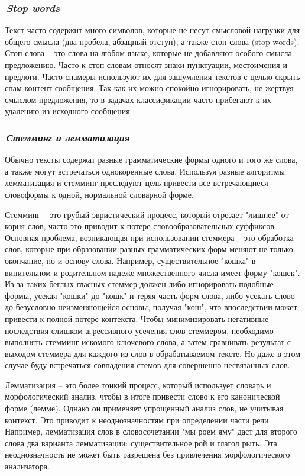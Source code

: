 \documentclass[12pt]{article}
\begin{document}
\subsubsection*{\it\,Stop words}
Текст часто содержит много символов, которые не несут смысловой нагрузки для общего смысла (два пробела, абзацный отступ), а также стоп слова (stop words).
Стоп слова -- это слова на любом языке, которые не добавляют особого смысла предложению. 	Часто к стоп словам относят знаки пунктуации, местоимения и предлоги. Часто спамеры используют их для зашумления текстов с целью скрыть спам контент сообщения. Так как их можно спокойно игнорировать, не жертвуя смыслом предложения, то в задачах классификации часто прибегают к их удалению из исходного сообщения.

\subsubsection{\it\,Стемминг и лемматизация}
Обычно тексты содержат разные грамматические формы одного и того же слова, а также могут встречаться однокоренные слова. Используя разные алгоритмы лемматизация и стемминг преследуют цель привести все встречающиеся словоформы к одной, нормальной словарной форме.


Стемминг -- это грубый эвристический процесс, который отрезает "лишнее" от корня слов, часто это приводит к потере словообразовательных суффиксов. Основная проблема, возникающая при использовании стеммера -- это обработка слов, которые при образовании разных грамматических форм меняют не только окончание, но и основу слова. Например, существительное "кошка" в винительном и родительном падеже множественного числа имеет форму "кошек". Из-за таких беглых гласных стеммер должен либо игнорировать подобные формы, усекая "кошки" до "кошк" и теряя часть форм слова, либо усекать слово до безусловно неизменяющейся основы, получая "кош", что впоследствии может привести к полной потере контекста. Чтобы минимизировать негативные последствия слишком агрессивного усечения слов стеммером, необходимо выполнять стемминг искомого ключевого слова, а затем сравнивать результат с выходом стеммера для каждого из слов в обрабатываемом тексте. Но даже в этом случае буду встречаться совпадения стемов для совершенно несвязанных слов.


Лемматизация -- это более тонкий процесс, который использует словарь и морфологический анализ, чтобы в итоге привести слово к его канонической форме (лемме). Однако он применяет упрощенный анализ слов, не учитывая контекст. Это приводит к неоднозначностям при определении части речи. Например, лемматизация слов в словосочетании "мы роем яму" даст для второго слова два варианта лемматизации: существительное рой и глагол рыть. Эта неоднозначность не может быть разрешена без привлечения морфологического анализатора.
\end{document}
